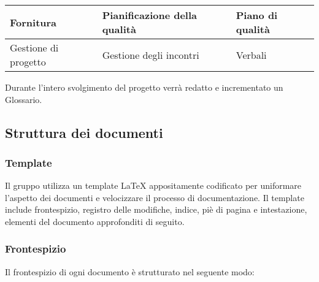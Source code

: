 \documentclass[../NormediProgetto.tex]{subfiles}
\begin{document}
\begin{longtable}{| p{4cm} |p{5cm} | p{4cm} |}
	\hline
	
	\newline Fornitura &
	\newline Pianificazione della qualità &
	\newline Piano di qualità \newline 
	\\[1em]
	
	\hline
	
	\newline Gestione di progetto &
	\newline Gestione degli incontri &
	\newline Verbali \newline 
	\\[1em]
	
	\hline
\end{longtable}

\noindent Durante l'intero svolgimento del progetto verrà redatto e incrementato un Glossario.


\subsection{Struttura dei documenti}

\subsubsection{Template}

Il gruppo utilizza un template \LaTeX{} appositamente codificato per uniformare l'aspetto dei documenti e velocizzare il processo di documentazione. Il template include frontespizio, registro delle modifiche, indice, piè di pagina e intestazione, elementi del documento approfonditi di seguito. 

\subsubsection{Frontespizio}

Il frontespizio di ogni documento è strutturato nel seguente modo:
\end{document}
